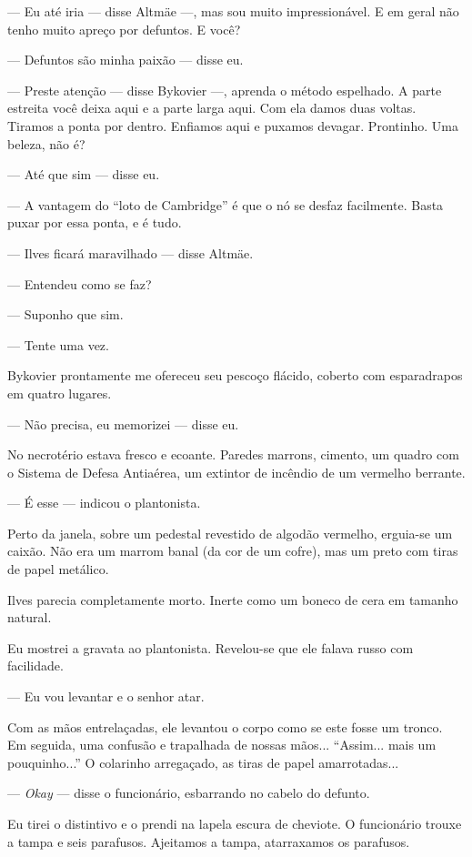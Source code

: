 --- Eu até iria --- disse Altmäe ---, mas sou muito impressionável. E em
geral não tenho muito apreço por defuntos. E você?

--- Defuntos são minha paixão --- disse eu.

--- Preste atenção --- disse Bykovier ---, aprenda o método espelhado. A
parte estreita você deixa aqui e a parte larga aqui. Com ela damos duas
voltas. Tiramos a ponta por dentro. Enfiamos aqui e puxamos devagar.
Prontinho. Uma beleza, não é?

--- Até que sim --- disse eu.

--- A vantagem do ``loto de Cambridge'' é que o nó se desfaz facilmente.
Basta puxar por essa ponta, e é tudo.

--- Ilves ficará maravilhado --- disse Altmäe.

--- Entendeu como se faz?

--- Suponho que sim.

--- Tente uma vez.

Bykovier prontamente me ofereceu seu pescoço flácido, coberto com
esparadrapos em quatro lugares.

--- Não precisa, eu memorizei --- disse eu.

No necrotério estava fresco e ecoante. Paredes marrons, cimento, um
quadro com o Sistema de Defesa Antiaérea, um extintor de incêndio de um
vermelho berrante.

--- É esse --- indicou o plantonista.

Perto da janela, sobre um pedestal revestido de algodão vermelho,
erguia-se um caixão. Não era um marrom banal (da cor de um cofre), mas
um preto com tiras de papel metálico.

Ilves parecia completamente morto. Inerte como um boneco de cera em
tamanho natural.

Eu mostrei a gravata ao plantonista. Revelou-se que ele falava russo com
facilidade.

--- Eu vou levantar e o senhor atar.

Com as mãos entrelaçadas, ele levantou o corpo como se este fosse um
tronco. Em seguida, uma confusão e trapalhada de nossas mãos...
``Assim... mais um pouquinho...'' O colarinho arregaçado, as tiras de
papel amarrotadas...

--- \emph{Okay} --- disse o funcionário, esbarrando no cabelo do
defunto.

Eu tirei o distintivo e o prendi na lapela escura de cheviote. O
funcionário trouxe a tampa e seis parafusos. Ajeitamos a tampa,
atarraxamos os parafusos.

